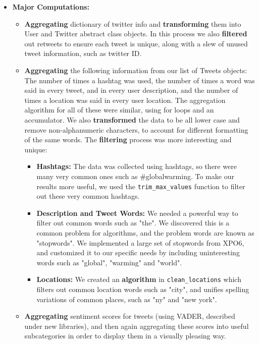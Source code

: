 \documentclass[fontsize=11pt]{article}
\begin{document}
\begin{itemize}
    \item \textbf{Major Computations:}
    
    \begin{itemize}
        \item \textbf{Aggregating} dictionary of twitter info and \textbf{transforming} them into User and Twitter abstract class objects. In this process we also \textbf{filtered} out retweets to ensure each tweet is unique, along with a slew of unused tweet information, such as twitter ID.
        
        \item \textbf{Aggregating} the following information from our list of Tweets objects: The number of times a hashtag was used, the number of times a word was said in every tweet, and in every user description, and the number of times a location was said in every user location. The aggregation algorithm for all of these were similar, using for loops and an accumulator. We also \textbf{transformed} the data to be all lower case and remove non-alphanumeric characters, to account for different formatting of the same words. The \textbf{filtering} process was more interesting and unique:
        \begin{itemize}
        \item \textbf{Hashtags:} The data was collected using hashtags, so there were many very common ones such as \#globalwarming. To make our results more useful, we used the \texttt{trim\_max\_values} function to filter out these very common hashtags. 
        \item \textbf{Description and Tweet Words:} We needed a powerful way to filter out common words such as "the". We discovered this is a common problem for algorithms, and the problem words are known as "stopwords". We implemented a large set of stopwords from XPO6, and customized it to our specific needs by including uninteresting words such as "global", "warming" and "world". 
         \item \textbf{Locations:} We created an \textbf{algorithm} in \texttt{clean\_locations} which filters out common location words such as "city", and unifies spelling variations of common places, such as "ny" and "new york".
         \end{itemize}
         \item \textbf{Aggregating} sentiment scores for tweets (using VADER, described under new libraries), and then again aggregating these scores into useful subcategories in order to display them in a visually pleasing way. 
    \end{itemize}
    

\end{itemize}
\end{document}
